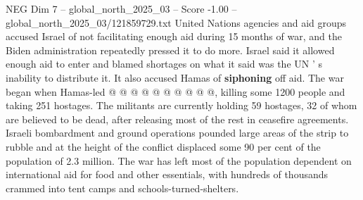 \begin{textsample}{NEG Dim 7 – global\_north\_2025\_03 – Score -1.00 – global\_north\_2025\_03/121859729.txt}
United Nations agencies and aid groups accused Israel of not facilitating enough aid during 15 months of war, and the Biden administration repeatedly pressed it to do more.
Israel said it allowed enough aid to enter and blamed shortages on what it said was the UN ' s inability to distribute it.
It also accused Hamas of \textbf{siphoning} off aid.
The war began when Hamas-led @ @ @ @ @ @ @ @ @ @, killing some 1200 people and taking 251 hostages.
The militants are currently holding 59 hostages, 32 of whom are believed to be dead, after releasing most of the rest in ceasefire agreements.
Israeli bombardment and ground operations pounded large areas of the strip to rubble and at the height of the conflict displaced some 90 per cent of the population of 2.3 million.
The war has left most of the population dependent on international aid for food and other essentials, with hundreds of thousands crammed into tent camps and schools-turned-shelters.

\end{textsample}
